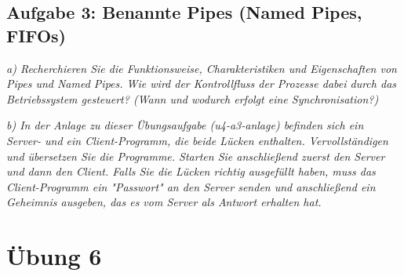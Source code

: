 \documentclass[a4paper]{article}
\begin{document}
\subsection{Aufgabe 3: Benannte Pipes (Named Pipes, FIFOs)}
\textit{a) Recherchieren Sie die Funktionsweise, Charakteristiken und Eigenschaften von Pipes und Named Pipes. Wie wird der Kontrollfluss der Prozesse dabei durch das Betriebssystem gesteuert? (Wann und wodurch erfolgt eine Synchronisation?)}
\vspace{10mm}


\textit{b) In der Anlage zu dieser Übungsaufgabe (u4-a3-anlage) befinden sich ein Server- und ein Client-Programm, die beide Lücken enthalten. Vervollständigen und übersetzen Sie die Programme. Starten Sie anschließend zuerst den Server und dann den Client. Falls Sie die Lücken richtig ausgefüllt haben, muss das Client-Programm ein "Passwort" an den Server senden und anschließend ein Geheimnis ausgeben, das es vom Server als Antwort erhalten hat.}
\vspace{10mm}


\newpage
\section{Übung 6}
\end{document}
